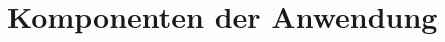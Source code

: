 
\label{chap:api_components}

\section{Komponenten der Anwendung}


\newpage

\newpage

\newpage

\newpage

\newpage
